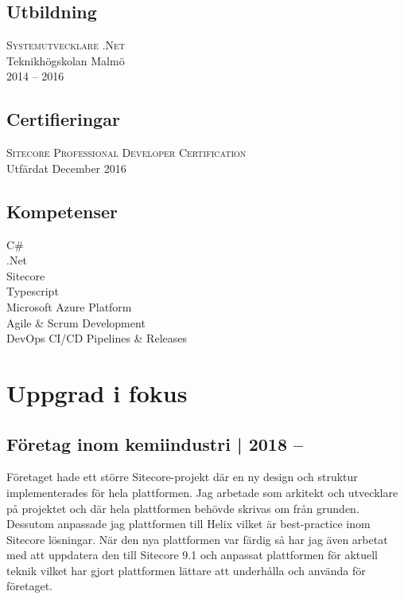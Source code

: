 \documentclass[usenames,dvipsnames]{article}
\begin{document}
\begin{minipage}[t]{0.4\textwidth}
\begin{flushleft}
\subsection*{\textcolor{NavyBlue}{Utbildning}}
\textsc{Systemutvecklare .Net}\\
Teknikhögskolan Malmö\\
2014 -- 2016

\subsection*{\textcolor{NavyBlue}{Certifieringar}}
\textsc{Sitecore Professional Developer Certification}\\
Utfärdat December 2016

\subsection*{\textcolor{NavyBlue}{Kompetenser}}
C\#\\
.Net\\
Sitecore\\
Typescript\\
Microsoft Azure Platform\\
Agile \& Scrum Development\\
DevOps CI/CD Pipelines \& Releases
\end{flushleft}
\end{minipage}
\newpage
\section*{\textcolor{NavyBlue}{Uppgrad i fokus}}

\subsection*{\textcolor{NavyBlue}{Företag inom kemiindustri | 2018 --}}
\begin{flushleft}
Företaget hade ett större Sitecore-projekt där en ny design och struktur implementerades för hela plattformen. Jag arbetade som arkitekt och utvecklare på projektet och där hela plattformen behövde skrivas om från grunden. Dessutom anpassade jag plattformen till Helix vilket är best-practice inom Sitecore lösningar. \break
När den nya plattformen var färdig så har jag även arbetat med att uppdatera den till Sitecore 9.1 och anpassat plattformen för aktuell teknik vilket har gjort plattformen lättare att underhålla och använda för företaget. 

\end{flushleft}
\end{document}
